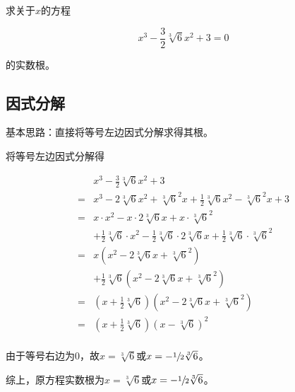 

求关于$x$的方程

\[ x^3 - \frac32\sqrt[3]6x^2 +3 = 0 \]

的实数根。


\subsection{因式分解}

基本思路：直接将等号左边因式分解求得其根。

将等号左边因式分解得

\begin{align*}
  & x^3 - \frac32\sqrt[3]6x^2 + 3 \\
  ={}& x^3 - 2\sqrt[3]6x^2 + \sqrt[3]6^2x + \frac12\sqrt[3]6x^2 - \sqrt[3]6^2x + 3 \\
  ={}& x\cdot x^2 - x\cdot 2\sqrt[3]6x + x\cdot\sqrt[3]6^2 \\
    &+ \frac12\sqrt[3]6\cdot x^2 - \frac12\sqrt[3]6\cdot2\sqrt[3]6x + \frac12\sqrt[3]6\cdot \sqrt[3]6^2 \\
  ={}& x\left(x^2 - 2\sqrt[3]6x + \sqrt[3]6^2\right) \\
  &+ \frac12\sqrt[3]6\left(x^2 - 2\sqrt[3]6x + \sqrt[3]6^2\right) \\
  ={}& \left(x + \frac12\sqrt[3]6\right)\left(x^2 - 2\sqrt[3]6x + \sqrt[3]6^2\right) \\
  ={}& \left(x + \frac12\sqrt[3]6\right)\left(x - \sqrt[3]6\right)^2 \\
\end{align*}

由于等号右边为0，故$x = \sqrt[3]6$或$x = -\sfrac12\sqrt[3]6$。

综上，原方程实数根为$x = \sqrt[3]6$或$x = -\sfrac12\sqrt[3]6$。
